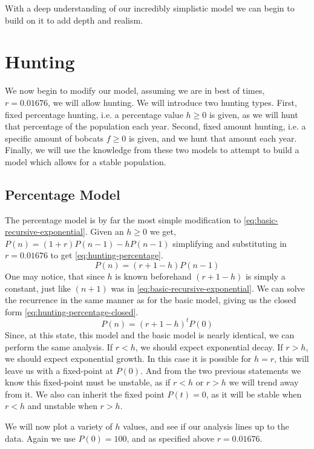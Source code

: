 \documentclass{article}
\begin{document}
With a deep understanding of our incredibly simplistic model we can begin to build on it to add depth and realism.

\section{Hunting}
We now begin to modify our model, assuming we are in best of times, $r = 0.01676$, we will allow hunting. We will introduce two hunting types. First, fixed percentage hunting, i.e. a percentage value $h \ge 0$ is given, as we will hunt that percentage of the population each year. Second, fixed amount hunting, i.e. a specific amount of bobcats $f \ge 0$ is given, and we hunt that amount each year. Finally, we will use the knowledge from these two models to attempt to build a model which allows for a stable population.

\subsection{Percentage Model}
The percentage model is by far the most simple modification to \cref{eq:basic-recursive-exponential}. Given an $h \ge 0$ we get, $P(n) = (1 + r)P(n-1) - hP(n-1)$ simplifying and substituting in $r=0.01676$ to get \cref{eq:hunting-percentage}.
\begin{equation}\label{eq:hunting-percentage}
    P(n) = (r+1-h)P(n-1)
\end{equation}
One may notice, that since $h$ is known beforehand $(r+1-h)$ is simply a constant, just like $(n+1)$ was in \cref{eq:basic-recursive-exponential}. We can solve the recurrence in the same manner as for the basic model, giving us the closed form \ref{eq:hunting-percentage-closed}.
\begin{equation}\label{eq:hunting-percentage-closed}
    P(n) = (r+1-h)^tP(0)
\end{equation}
Since, at this state, this model and the basic model is nearly identical, we can perform the same analysis. If $r < h$, we should expect exponential decay. If $r > h$, we should expect exponential growth. In this case it is possible for $h = r$, this will leave us with a fixed-point at $P(0)$. And from the two previous statements we know this fixed-point must be unstable, as if $r < h$ or $r > h$ we will trend away from it. We also can inherit the fixed point $P(t)=0$, as it will be stable when $r < h$ and unstable when $r > h$.

We will now plot a variety of $h$ values, and see if our analysis lines up to the data. Again we use $P(0)=100$, and as specified above $r = 0.01676$.
\end{document}
